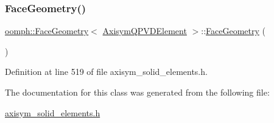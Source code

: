 \subsubsection{\texorpdfstring{Face\+Geometry()}{FaceGeometry()}}
{\footnotesize\ttfamily \hyperlink{classoomph_1_1FaceGeometry}{oomph\+::\+Face\+Geometry}$<$ \hyperlink{classoomph_1_1AxisymQPVDElement}{Axisym\+Q\+P\+V\+D\+Element} $>$\+::\hyperlink{classoomph_1_1FaceGeometry}{Face\+Geometry} (\begin{DoxyParamCaption}{ }\end{DoxyParamCaption})\hspace{0.3cm}{\ttfamily [inline]}}



Definition at line 519 of file axisym\+\_\+solid\+\_\+elements.\+h.



The documentation for this class was generated from the following file\+:\begin{DoxyCompactItemize}
\item 
\hyperlink{axisym__solid__elements_8h}{axisym\+\_\+solid\+\_\+elements.\+h}\end{DoxyCompactItemize}
